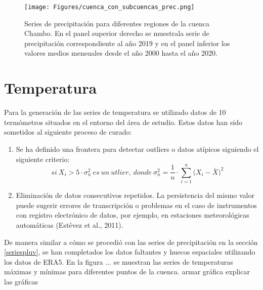 \begin{figure}[h!]
  \begin{center}
    \texttt{[image: Figures/cuenca\_con\_subcuencas\_prec.png]}
    \caption{ Series de precipitación para diferentes regiones de la cuenca Chambo. En el panel superior derecho se muestrala serie 
    de precipitación correspondiente al año 2019 y en el panel inferior los valores medios mensuales desde el año 2000 hasta el año 2020.}
    \label{4}
  \end{center}
\end{figure}




\section{Temperatura}
\label{tempint}
Para la generación de las series de temperatura se utilizado datos de 10 termómetros situados en el entorno del área de estudio.
Estos datos han sido sometidos al siguiente proceso de curado:

\begin{enumerate}
  \item Se ha definido una frontera para detectar outliers o datos atípicos siguiendo el siguiente criterio:
  \begin{equation}
    si~X_i>5\cdot\sigma^2_n~es~un~utlier,~donde~\sigma^2_n=\frac{1}{n}\cdot\sum^n_{i=1}\bigg(X_i-\bar{X}\bigg)^2
  \end{equation}
  \item Eliminación de datos consecutivos repetidos. La persistencia del mismo valor puede sugerir errores 
  de transcripción o problemas en el caso de instrumentos con registro electrónico de datos, por ejemplo, en estaciones meteorológicas automáticas (Estévez et al., 2011).
\end{enumerate}

De manera similar a cómo se procedió con las series de precipitación en la sección \ref{seriespluv}, se han completados
los datos faltantes y huecos espaciales utilizando los datos de ERA5. En la figura ... se muestran las series de temperaturas 
máximas y mínimas para diferentes puntos de la cuenca.
\textcolor{codegreen}{armar gráfica}
\textcolor{codegreen}{explicar las gráficas}




